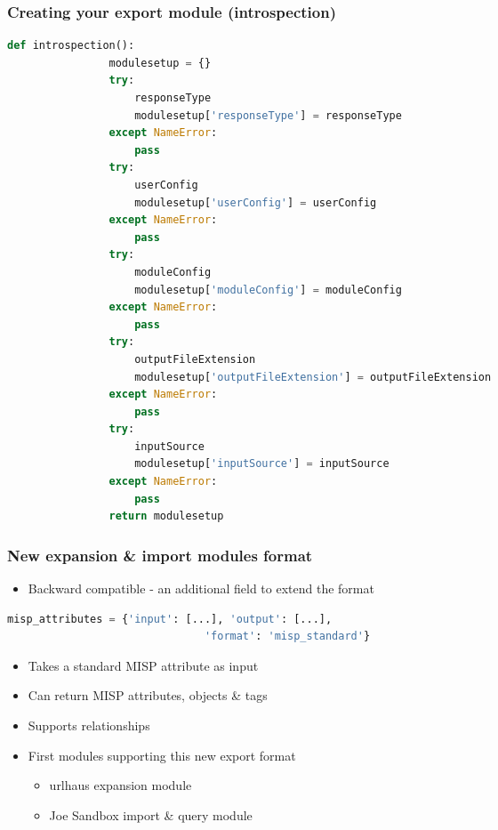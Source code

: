 \begin{frame}[fragile]
    \frametitle{Creating your export module (introspection)}
    \begin{adjustbox}{width=\textwidth,height=5cm,keepaspectratio}
        \begin{lstlisting}[language=python]
            def introspection():
                modulesetup = {}
                try:
                    responseType
                    modulesetup['responseType'] = responseType
                except NameError:
                    pass
                try:
                    userConfig
                    modulesetup['userConfig'] = userConfig
                except NameError:
                    pass
                try:
                    moduleConfig
                    modulesetup['moduleConfig'] = moduleConfig
                except NameError:
                    pass
                try:
                    outputFileExtension
                    modulesetup['outputFileExtension'] = outputFileExtension
                except NameError:
                    pass
                try:
                    inputSource
                    modulesetup['inputSource'] = inputSource
                except NameError:
                    pass
                return modulesetup
        \end{lstlisting}
    \end{adjustbox}
\end{frame}

\begin{frame}[fragile]
    \frametitle{New expansion \& import modules format}
    \begin{itemize}
        \item Backward compatible - an additional field to extend the format
    \end{itemize}
    \begin{adjustbox}{width=\textwidth,height=5cm,keepaspectratio}
        \begin{lstlisting}[language=python]
            misp_attributes = {'input': [...], 'output': [...],
                               'format': 'misp_standard'}
        \end{lstlisting}
    \end{adjustbox}
    \begin{itemize}
        \item Takes a standard MISP attribute as input
        \item Can return MISP attributes, objects \& tags
        \item Supports relationships
        \item First modules supporting this new export format
            \begin{itemize}
                \item urlhaus expansion module
                \item Joe Sandbox import \& query module
            \end{itemize}
    \end{itemize}
\end{frame}

